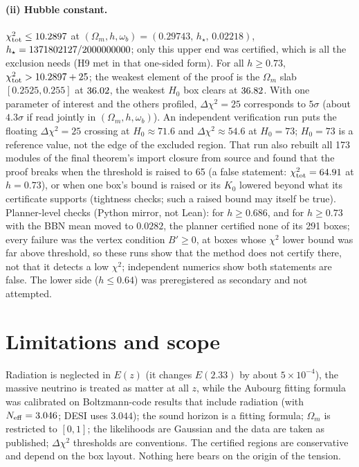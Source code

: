 \documentclass[11pt]{article}
\begin{document}
\paragraph{(ii) Hubble constant.} $\chi^2_{\rm tot}\le10.2897$ at $(\Omega_m,h,\omega_b)=(0.29743,\,h_\star,\,0.02218)$, $h_\star=1371802127/2000000000$; only this upper end was certified, which is all
the exclusion needs (H9 met in that one-sided form). For all $h\ge0.73$, $\chi^2_{\rm tot}>10.2897+25$; the weakest element of the proof is the $\Omega_m$ slab $[0.2525,0.255]$ at $36.02$,
the weakest $H_0$ box clears at $36.82$. With one parameter of interest and the others profiled, $\Delta\chi^2=25$ corresponds to $5\sigma$ (about $4.3\sigma$ if read jointly in
$(\Omega_m,h,\omega_b)$). An independent verification run puts the floating $\Delta\chi^2=25$ crossing at $H_0\approx71.6$ and $\Delta\chi^2\approx54.6$ at $H_0=73$; $H_0=73$ is a
reference value, not the edge of the excluded region. That run also rebuilt all 173 modules of the final theorem's import closure from source and found that the proof breaks when the
threshold is raised to 65 (a false statement: $\chi^2_{\rm tot}=64.91$ at $h=0.73$), or when one box's bound is raised or its $K_0$ lowered beyond what its certificate supports (tightness
checks; such a raised bound may itself be true). Planner-level checks (Python mirror, not Lean): for $h\ge0.686$, and for $h\ge0.73$ with the BBN mean moved to $0.0282$, the planner certified
none of its 291 boxes; every failure was the vertex condition $B'\ge0$, at boxes whose $\chi^2$ lower bound was far above threshold, so these runs show that the method does not certify there,
not that it detects a low $\chi^2$; independent numerics show both statements are false. The lower side ($h\le0.64$) was preregistered as secondary and not attempted.

\section{Limitations and scope}
Radiation is neglected in $E(z)$ (it changes $E(2.33)$ by about $5\times10^{-4}$), the massive neutrino is treated as matter at all $z$, while the Aubourg fitting formula was calibrated on
Boltzmann-code results that include radiation (with $N_{\rm eff}=3.046$; DESI uses $3.044$); the sound horizon is a fitting formula; $\Omega_m$ is restricted to $[0,1]$; the likelihoods are
Gaussian and the data are taken as published; $\Delta\chi^2$ thresholds are conventions. The certified regions are conservative and depend on the box layout. Nothing here bears on the origin
of the tension.
\end{document}
